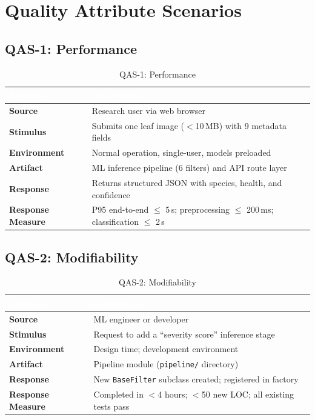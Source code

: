 \documentclass[11pt,a4paper,oneside]{report}
\newcommand{\file}[1]{\texttt{\footnotesize #1}}
\newcommand{\code}[1]{\texttt{\footnotesize #1}}
\begin{document}
\newpage
\section{Quality Attribute Scenarios}

\subsection{QAS-1: Performance}
\begin{table}[H]
\centering\footnotesize
\caption{QAS-1: Performance}
\label{tab:qas-perf}
\begin{tabularx}{\textwidth}{>{\bfseries}p{2.5cm} X}
\toprule
\rowcolor{tableheader}
\textcolor{white}{Element} & \textcolor{white}{Description} \\
\midrule
Source          & Research user via web browser \\
Stimulus        & Submits one leaf image ($<$10\,MB) with 9 metadata fields \\
Environment     & Normal operation, single-user, models preloaded \\
Artifact        & ML inference pipeline (6 filters) and API route layer \\
Response        & Returns structured JSON with species, health, and confidence \\
Response Measure & P95 end-to-end $\leq$ 5\,s; preprocessing $\leq$ 200\,ms; classification $\leq$ 2\,s \\
\bottomrule
\end{tabularx}
\end{table}

\subsection{QAS-2: Modifiability}
\begin{table}[H]
\centering\footnotesize
\caption{QAS-2: Modifiability}
\label{tab:qas-mod}
\begin{tabularx}{\textwidth}{>{\bfseries}p{2.5cm} X}
\toprule
\rowcolor{tableheader}
\textcolor{white}{Element} & \textcolor{white}{Description} \\
\midrule
Source          & ML engineer or developer \\
Stimulus        & Request to add a ``severity score'' inference stage \\
Environment     & Design time; development environment \\
Artifact        & Pipeline module (\file{pipeline/} directory) \\
Response        & New \code{BaseFilter} subclass created; registered in factory \\
Response Measure & Completed in $<$4 hours; $<$50 new LOC; all existing tests pass \\
\bottomrule
\end{tabularx}
\end{table}
\end{document}
